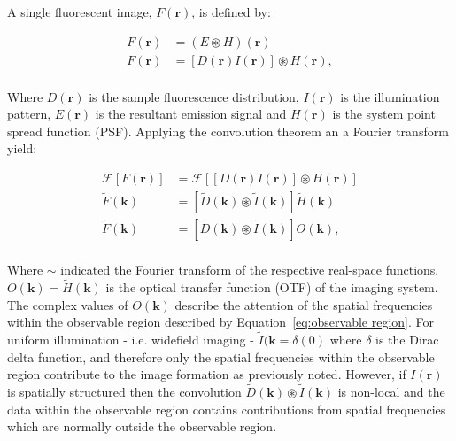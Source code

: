 A single fluorescent image, $F(\textbf{r})$, is defined by:

\begin{equation}\label{eq:fluorescent_image}
\begin{split}
F(\textbf{r}) &= (E \circledast H)(\textbf{r})\\
F(\textbf{r}) &= [D(\textbf{r})I(\textbf{r})] \circledast H(\textbf{r}),\\
\end{split}
\end{equation}

Where $D(\textbf{r})$ is the sample fluorescence distribution, $I(\textbf{r})$ 
is the illumination pattern, $E(\textbf{r})$ is the resultant emission signal 
and $H(\textbf{r})$ is the system point spread function (PSF). Applying the 
convolution theorem an a Fourier transform yield:

\begin{equation}\label{eq:SIM_fluorescent_image_fourier}
\begin{split}
\mathcal{F}\left[F(\textbf{r})\right] &= \mathcal{F}\left[\left[D(\textbf{r})I(\textbf{r})\right] \circledast H(\textbf{r})\right]\\
\tilde{F}(\textbf{k}) &= \left[\tilde{D}(\textbf{k})\circledast \tilde{I}(\textbf{k})\right] \tilde{H}(\textbf{k})\\
\tilde{F}(\textbf{k}) &= \left[\tilde{D}(\textbf{k})\circledast \tilde{I}(\textbf{k})\right] O(\textbf{k}),\\
\end{split}
\end{equation}

Where $\sim$ indicated the Fourier transform of the respective real-space
functions. $O(\textbf{k}) = \tilde{H}(\textbf{k})$ is the optical transfer
function (OTF) of the imaging system. The complex values of $O(\textbf{k})$
describe the attention of the spatial frequencies within the observable region
described by Equation~\ref{eq:observable region}. For uniform illumination -
i.e. widefield imaging - $\tilde{I}(\textbf{k} = \delta(0)$ where $\delta$ is
the Dirac delta function, and therefore only the spatial frequencies within the
observable region contribute to the image formation as previously noted. 
However, if $I(\textbf{r})$ is spatially structured then the convolution
$\tilde{D}(\textbf{k})\circledast \tilde{I}(\textbf{k})$ is non-local and the 
data within the observable region contains contributions from spatial 
frequencies which are normally outside the observable region.

